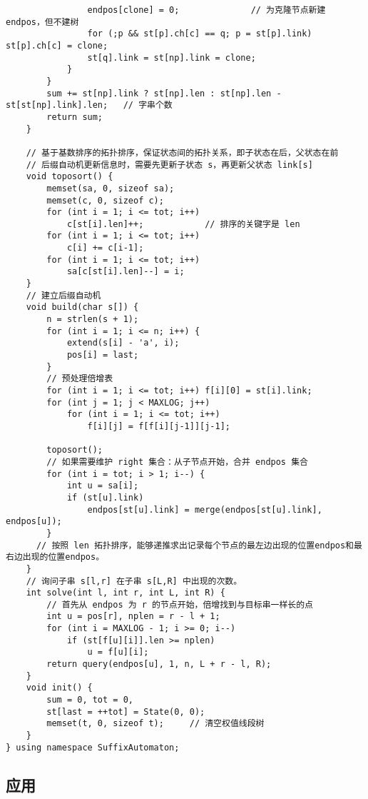 \begin{verbatim}
                endpos[clone] = 0;              // 为克隆节点新建 endpos，但不建树
                for (;p && st[p].ch[c] == q; p = st[p].link) st[p].ch[c] = clone;
                st[q].link = st[np].link = clone;
            }
        }
        sum += st[np].link ? st[np].len : st[np].len - st[st[np].link].len;   // 字串个数
        return sum;          
    }
    
    // 基于基数排序的拓扑排序，保证状态间的拓扑关系，即子状态在后，父状态在前
    // 后缀自动机更新信息时，需要先更新子状态 s，再更新父状态 link[s]
    void toposort() {
        memset(sa, 0, sizeof sa);
        memset(c, 0, sizeof c);
        for (int i = 1; i <= tot; i++)
            c[st[i].len]++;            // 排序的关键字是 len
        for (int i = 1; i <= tot; i++)
            c[i] += c[i-1];
        for (int i = 1; i <= tot; i++)
            sa[c[st[i].len]--] = i;
    }
    // 建立后缀自动机
    void build(char s[]) {
        n = strlen(s + 1);
        for (int i = 1; i <= n; i++) {
            extend(s[i] - 'a', i);
            pos[i] = last;
        }
        // 预处理倍增表
        for (int i = 1; i <= tot; i++) f[i][0] = st[i].link;
        for (int j = 1; j < MAXLOG; j++)
            for (int i = 1; i <= tot; i++)
                f[i][j] = f[f[i][j-1]][j-1];

        toposort();
        // 如果需要维护 right 集合：从子节点开始，合并 endpos 集合
        for (int i = tot; i > 1; i--) {
            int u = sa[i];
            if (st[u].link)
                endpos[st[u].link] = merge(endpos[st[u].link], endpos[u]);
        }
      // 按照 len 拓扑排序，能够递推求出记录每个节点的最左边出现的位置endpos和最右边出现的位置endpos。
    }
    // 询问子串 s[l,r] 在子串 s[L,R] 中出现的次数。
    int solve(int l, int r, int L, int R) {
        // 首先从 endpos 为 r 的节点开始，倍增找到与目标串一样长的点
        int u = pos[r], nplen = r - l + 1;
        for (int i = MAXLOG - 1; i >= 0; i--)
            if (st[f[u][i]].len >= nplen)
                u = f[u][i];
        return query(endpos[u], 1, n, L + r - l, R);
    }
    void init() {
        sum = 0, tot = 0,
        st[last = ++tot] = State(0, 0);
        memset(t, 0, sizeof t);     // 清空权值线段树
    }
} using namespace SuffixAutomaton;
\end{verbatim}

\subsection{应用}

